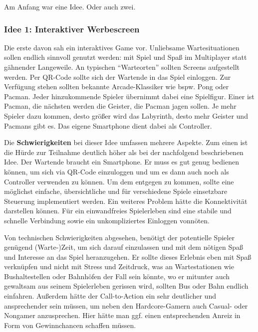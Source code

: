 
Am Anfang war eine Idee. Oder auch zwei.

\subsubsection{Idee 1: Interaktiver Werbescreen}

Die erste davon sah ein interaktives Game vor. Unliebsame Wartesituationen sollen endlich sinnvoll genutzt werden: mit Spiel und Spaß im Multiplayer statt gähnender Langeweile. An typischen \enquote{Warteorten} sollten Screens aufgestellt werden. Per QR-Code sollte sich der Wartende in das Spiel einloggen. Zur Verfügung stehen sollten bekannte Arcade-Klassiker wie bspw. Pong oder Pacman. Jeder hinzukommende Spieler übernimmt dabei eine Spielfigur. Einer ist Pacman, die nächsten werden die Geister, die Pacman jagen sollen. Je mehr Spieler dazu kommen, desto größer wird das Labyrinth, desto mehr Geister und Pacmans gibt es. Das eigene Smartphone dient dabei als Controller.

Die \textbf{Schwierigkeiten} bei dieser Idee umfassen mehrere Aspekte. Zum einen ist die Hürde zur Teilnahme deutlich höher als bei der nachfolgend beschriebenen Idee. Der Wartende braucht ein Smartphone. Er muss es gut genug bedienen können, um sich via QR-Code einzuloggen und um es dann auch noch als Controller verwenden zu können. Um dem entgegen zu kommen, sollte eine möglichst einfache, übersichtliche und für verschiedene Spiele einsetzbare Steuerung implementiert werden. Ein weiteres Problem hätte die Konnektivität darstellen können. Für ein einwandfreies Spielerleben sind eine stabile und schnelle Verbindung sowie ein unkompliziertes Einloggen vonnöten.

Von technischen Schwierigkeiten abgesehen, benötigt der potentielle Spieler genügend (Warte-)Zeit, um sich darauf einzulassen und mit dem nötigen Spaß und Interesse an das Spiel heranzugehen. Er sollte dieses Erlebnis eben mit Spaß verknüpfen und nicht mit Stress und Zeitdruck, was an Wartestationen wie Bushaltestellen oder Bahnhöfen der Fall sein könnte, wo er mitunter auch gewaltsam aus seinem Spielerleben gerissen wird, sollten Bus oder Bahn endlich einfahren. Außerdem hätte der Call-to-Action ein sehr deutlicher und ansprechender sein müssen, um neben den Hardcore-Gamern auch Casual- oder Nongamer anzusprechen. Hier hätte man ggf. einen entsprechenden Anreiz in Form von Gewinnchancen schaffen müssen.

